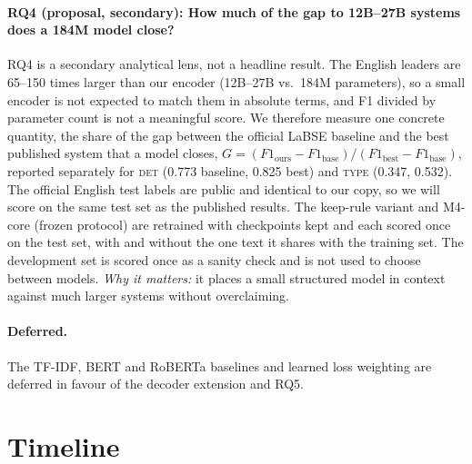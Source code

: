 \documentclass[11pt]{article}
\newcommand{\DET}{\textsc{det}}
\newcommand{\TYPE}{\textsc{type}}
\begin{document}
\paragraph{RQ4 (proposal, secondary): How much of the gap to 12B--27B systems does a 184M model close?}
RQ4 is a secondary analytical lens, not a headline result. The English
leaders are 65--150 times larger than our encoder (12B--27B vs.\ 184M
parameters), so a small encoder is not expected to match them in absolute
terms, and F1 divided by parameter count is not a meaningful score. We
therefore measure one concrete quantity, the share of the gap between the
official LaBSE baseline and the best published system that a model closes,
$G = (F1_{\text{ours}} - F1_{\text{base}})/(F1_{\text{best}} - F1_{\text{base}})$,
reported separately for \DET{} (0.773 baseline, 0.825 best) and \TYPE{}
(0.347, 0.532). The official English test labels are public and identical to
our copy, so we will score on the same test set as the published results.
The keep-rule variant and M4-core (frozen protocol) are retrained with
checkpoints kept and each scored once on the test set, with and without the
one text it shares with the training set. The development set is scored once as a sanity check and
is not used to choose between models.
\emph{Why it matters:} it places a small structured model in context
against much larger systems without overclaiming.

\paragraph{Deferred.}
The TF-IDF, BERT and RoBERTa baselines and learned loss weighting
\citep{kendall2018} are deferred in favour of the decoder extension and RQ5.

\section{Timeline}
\label{sec:timeline}
\end{document}

